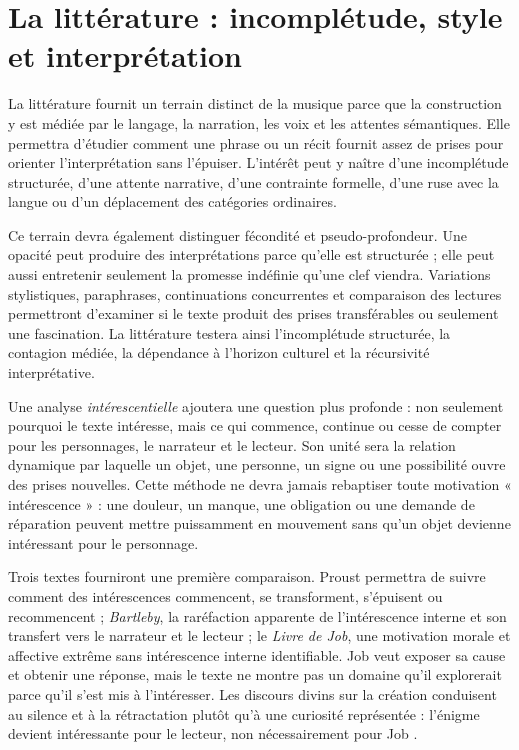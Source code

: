 \documentclass[11pt,a4paper]{article}
\begin{document}
\section{La littérature : incomplétude, style et interprétation}

La littérature fournit un terrain distinct de la musique parce que la
construction y est médiée par le langage, la narration, les voix et les attentes
sémantiques. Elle permettra d'étudier comment une phrase ou un récit fournit
assez de prises pour orienter l'interprétation sans l'épuiser. L'intérêt peut y
naître d'une incomplétude structurée, d'une attente narrative, d'une contrainte
formelle, d'une ruse avec la langue ou d'un déplacement des catégories
ordinaires.

Ce terrain devra également distinguer fécondité et pseudo-profondeur. Une
opacité peut produire des interprétations parce qu'elle est structurée ; elle
peut aussi entretenir seulement la promesse indéfinie qu'une clef viendra.
Variations stylistiques, paraphrases, continuations concurrentes et comparaison
des lectures permettront d'examiner si le texte produit des prises
transférables ou seulement une fascination. La littérature testera ainsi
l'incomplétude structurée, la contagion médiée, la dépendance à l'horizon
culturel et la récursivité interprétative.

Une analyse \emph{intérescentielle} ajoutera une question plus profonde : non
seulement pourquoi le texte intéresse, mais ce qui commence, continue ou cesse
de compter pour les personnages, le narrateur et le lecteur. Son unité sera la
relation dynamique par laquelle un objet, une personne, un signe ou une
possibilité ouvre des prises nouvelles. Cette méthode ne devra jamais rebaptiser
toute motivation « intérescence » : une douleur, un manque, une obligation ou
une demande de réparation peuvent mettre puissamment en mouvement sans qu'un
objet devienne intéressant pour le personnage.

Trois textes fourniront une première comparaison. Proust permettra de suivre
comment des intérescences commencent, se transforment, s'épuisent ou recommencent ;
\emph{Bartleby}, la raréfaction apparente de l'intérescence interne et son
transfert vers le narrateur et le lecteur ; le \emph{Livre de Job}, une
motivation morale et affective extrême sans intérescence interne identifiable.
Job veut exposer sa cause et obtenir une réponse, mais le texte ne montre pas un
domaine qu'il explorerait parce qu'il s'est mis à l'intéresser. Les discours
divins sur la création conduisent au silence et à la rétractation plutôt qu'à
une curiosité représentée : l'énigme devient intéressante pour le lecteur, non
nécessairement pour Job \parencite{jps1985tanakh}.
\end{document}
